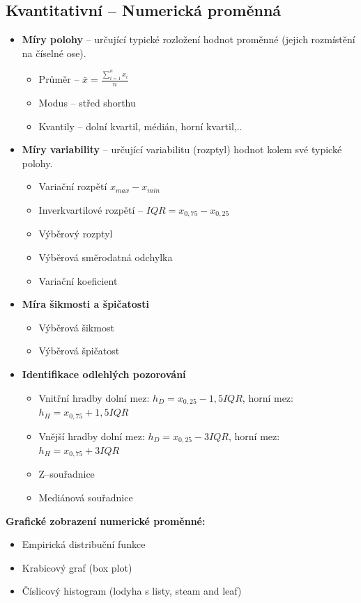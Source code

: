  \subsection{Kvantitativní -- Numerická proměnná}
\begin{itemize}
	\item \textbf{Míry polohy} --  určující typické rozložení hodnot proměnné (jejich rozmístění na číselné ose).

 		\begin{itemize}
 			\item Průměr -- $\bar{x} = \frac{\sum\limits_{i=1}^n x_i}{n}$
 			\item Modus -- střed shorthu
 			\item Kvantily -- dolní kvartil, médián, horní kvartil,..
 		\end{itemize}
 	\item \textbf{Míry variability} -- určující variabilitu (rozptyl) hodnot kolem své typické polohy.
 		\begin{itemize}
 			\item Variační rozpětí $x_{max} - x_{min}$
 			\item Inverkvartilové rozpětí -- $IQR = x_{0,75} - x_{0,25}$
 			\item Výběrový rozptyl
 			\item Výběrová směrodatná odchylka
 			\item Variační koeficient
 		\end{itemize}
 	\item \textbf{Míra šikmosti a špičatosti}	
 		\begin{itemize}
 			\item Výběrová šikmost
 			\item Výběrová špičatost
 		\end{itemize}
 	\item \textbf{Identifikace odlehlých pozorování}	
 		\begin{itemize}
 			\item Vnitřní hradby dolní mez: $h_D = x_{0,25} - 1,5IQR$, horní mez: $h_H = x_{0,75} + 1,5IQR$
 			\item Vnější hradby dolní mez: $h_D = x_{0,25} - 3IQR$, horní mez: $h_H = x_{0,75} + 3IQR$
 			\item Z--souřadnice
 			\item Mediánová souřadnice
 		\end{itemize}
\end{itemize}

\textbf{Grafické zobrazení numerické proměnné:}
\begin{itemize}
	\item Empirická distribuční funkce
	\item Krabicový graf (box plot)
	\item Číslicový histogram (lodyha s listy, steam and leaf)
\end{itemize}

